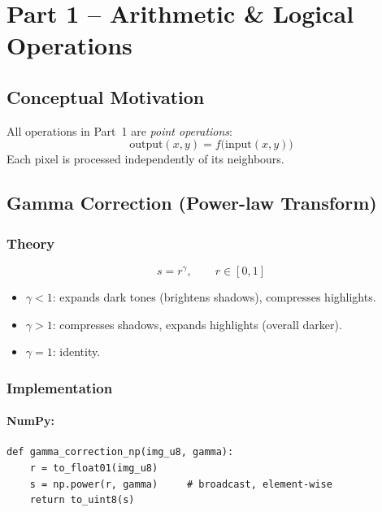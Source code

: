 \documentclass[12pt,a4paper]{article}
\begin{document}
\section{Part 1 -- Arithmetic \& Logical Operations}

\subsection{Conceptual Motivation}
All operations in Part~1 are \emph{point operations}:
\[
  \text{output}(x,y) = f\!\bigl(\text{input}(x,y)\bigr)
\]
Each pixel is processed independently of its neighbours.

\subsection{Gamma Correction (Power-law Transform)}

\subsubsection*{Theory}
\begin{equation}
  s = r^{\gamma}, \qquad r \in [0,1]
\end{equation}
\begin{itemize}[leftmargin=*]
  \item $\gamma < 1$: expands dark tones (brightens shadows), compresses highlights.
  \item $\gamma > 1$: compresses shadows, expands highlights (overall darker).
  \item $\gamma = 1$: identity.
\end{itemize}

\subsubsection*{Implementation}

\paragraph{NumPy:}
\begin{lstlisting}
def gamma_correction_np(img_u8, gamma):
    r = to_float01(img_u8)
    s = np.power(r, gamma)     # broadcast, element-wise
    return to_uint8(s)
\end{lstlisting}
\end{document}
